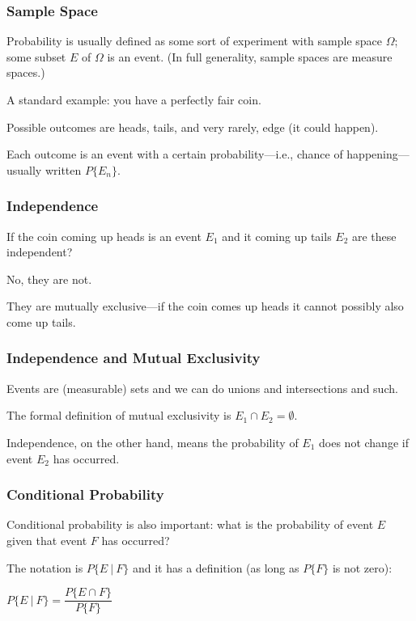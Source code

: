 \begin{frame}
\frametitle{Sample Space}

Probability is usually defined as some sort of experiment with sample space $\Omega$; some subset $E$ of $\Omega$ is an \alert{event}. (In full generality, sample spaces are measure spaces.)

A standard example: you have a perfectly fair coin. 

Possible outcomes are heads, tails, and very rarely, edge (it could happen). 

Each outcome is an event with a certain probability---i.e., chance of happening---usually written $P\{E_{n}\}$.


\end{frame}



\begin{frame}
\frametitle{Independence}

If the coin coming up heads is an event $E_{1}$ and it coming up tails $E_{2}$ are these independent? 

No, they are not. 

They are mutually exclusive---if the coin comes up heads it cannot possibly also come up tails. 


\end{frame}



\begin{frame}
\frametitle{Independence and Mutual Exclusivity}

Events are (measurable) sets and we can do unions and intersections and such. 

The formal definition of mutual exclusivity is $E_{1} \cap E_{2} = \emptyset$. 

Independence, on the other hand, means the probability of $E_{1}$ does not change if event $E_{2}$ has occurred.


\end{frame}



\begin{frame}
\frametitle{Conditional Probability}

Conditional probability is also important: what is the probability of event $E$ given that event $F$ has occurred? 

The notation is $P\{ E~|~F \}$ and it has a definition (as long as $P\{F\}$ is not zero): 

\begin{center}
	$P\{E~|~F\} = \dfrac{P\{E \cap F\}}{P\{F\}}$
\end{center}

\end{frame}



